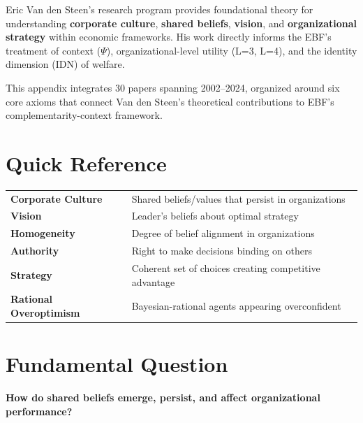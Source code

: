 Eric Van den Steen's research program provides foundational theory for understanding
\textbf{corporate culture}, \textbf{shared beliefs}, \textbf{vision}, and
\textbf{organizational strategy} within economic frameworks. His work directly
informs the EBF's treatment of context ($\Psi$), organizational-level utility
(L=3, L=4), and the identity dimension (IDN) of welfare.

This appendix integrates 30 papers spanning 2002--2024, organized around six
core axioms that connect Van den Steen's theoretical contributions to EBF's
complementarity-context framework.

\section{Quick Reference}

\begin{tcolorbox}[colback=yellow!5!white, colframe=yellow!75!black, title=Key Concepts]
\begin{tabular}{@{}ll@{}}
\textbf{Corporate Culture} & Shared beliefs/values that persist in organizations \\
\textbf{Vision} & Leader's beliefs about optimal strategy \\
\textbf{Homogeneity} & Degree of belief alignment in organizations \\
\textbf{Authority} & Right to make decisions binding on others \\
\textbf{Strategy} & Coherent set of choices creating competitive advantage \\
\textbf{Rational Overoptimism} & Bayesian-rational agents appearing overconfident \\
\end{tabular}
\end{tcolorbox}

\section{Fundamental Question}

\begin{tcolorbox}[colback=red!5!white, colframe=red!75!black,
    title=The Van den Steen Question]
\centering\Large
\textbf{How do shared beliefs emerge, persist, and affect organizational performance?}
\end{tcolorbox}

